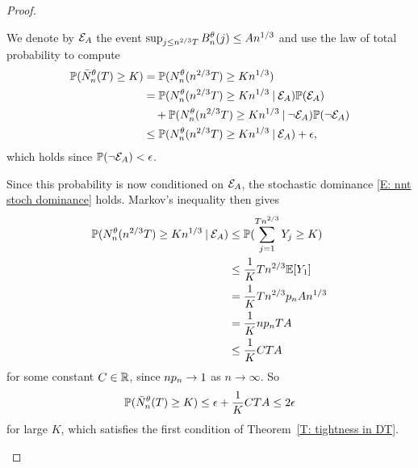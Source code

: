 \begin{proof}
\begin{proofpart}
We denote by $\mathcal{E}_{A}$ the event $\sup_{j \leq n^{2 / 3}T} B_n^{\theta}(j) \leq An^{1 / 3}$ and use the law of total probability to compute
\begin{equation} \label{E: First Total Probability Argument}
\begin{aligned}
\mathbb{P}(\bar{N}_n^{\theta}(T) \geq K) 
&= \mathbb{P}(N_n^{\theta}(n^{2 / 3}T) \geq Kn^{1 / 3}) \\
&=  \mathbb{P}(N_n^{\theta}(n^{2 / 3}T) \geq Kn^{1 / 3} \: | \: \mathcal{E}_{A}) \mathbb{P}(\mathcal{E}_{A}) \\
&\quad + \mathbb{P}(N_n^{\theta}(n^{2 / 3}T) \geq Kn^{1 / 3} \: | \: \neg\mathcal{E}_{A}) \mathbb{P}(\neg \mathcal{E}_{A}) \\
&\leq \mathbb{P}(N_n^{\theta}(n^{2 / 3}T) \geq Kn^{1 / 3} \: | \: \mathcal{E}_{A}) + \epsilon, \\
\end{aligned}	
\end{equation}
which holds since $\mathbb{P}(\neg\mathcal{E}_{A}) <\epsilon$.

Since this probability is now conditioned on $\mathcal{E}_{A}$, the stochastic dominance \eqref{E: nnt stoch dominance} holds.
Markov's inequality then gives
\begin{align*}
\mathbb{P}(N_n^{\theta}(n^{2 / 3}T) \geq Kn^{1 / 3} \: | \: \mathcal{E}_{A}) 
&\leq \mathbb{P}( \sum_{j=1}^{Tn^{2 / 3}} Y_j \geq K) \\
&\leq \frac{1}{K}Tn^{2 / 3} \mathbb{E}[Y_1] \\
&= \frac{1}{K}Tn^{2 / 3} p_n An^{1 / 3} \\
&= \frac{1}{K}np_n TA \\
&\leq \frac{1}{K}CTA
\end{align*}
for some constant $C \in \mathbb{R}$, since $np_n \rightarrow 1$ as $n \rightarrow \infty$.
So
\begin{equation}
\mathbb{P}(\bar{N}_n^{\theta}(T) \geq K) \leq \epsilon + \frac{1}{K}CTA \leq 2 \epsilon
\end{equation}
for large $K$, which satisfies the first condition of Theorem~\ref{T: tightness in DT}.

\bigskip


\end{proofpart}
\end{proof}
